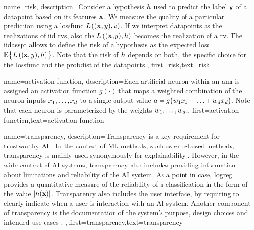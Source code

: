 {name={risk},
	description={Consider a \gls{hypothesis} $h$ used to predict the \gls{label} 
		$y$ of a \gls{datapoint} based on its \gls{feature}s ${\bf x}$. We measure 
		the quality of a particular \gls{prediction} using a \gls{lossfunc} $L\left(({\bf x},y),h \right)$. 
		If we interpret \gls{datapoint}s as the \gls{realization}s of \gls{iid} \gls{rv}s, 
		also the $L\left(({\bf x},y),h \right)$ becomes the \gls{realization} 
		of a \gls{rv}. The \gls{iidasspt} allows to define the risk of a \gls{hypothesis} 
		as the expected \gls{loss} $\mathbb{E} \big\{L\left(({\bf x},y),h \right) \big\}$. 
		Note that the risk of $h$ depends on both, the specific choice for the \gls{lossfunc} and the 
		\gls{probdist} of the \gls{datapoint}s.},
	first={risk},text={risk} 
}

{name={activation function},
	description={Each artificial neuron within an \gls{ann} is 
		assigned an activation function $g(\cdot)$ that maps a weighted combination of 
		the neuron inputs $x_{1},\ldots,x_{d}$ to a single output 
		value $a = g\big(w_{1} x_{1}+\ldots+w_{d} x_{d} \big)$. 
		Note that each neuron is parameterized by the weights $w_{1},\ldots,w_{d}$.},
first={activation function},text={activation function} 
}




{name={transparency},
	description={Transparency is a key requirement for 
		trustworthy AI \cite{HLEGTrustworhtyAI}. In the context of ML methods, 
		such as \gls{erm}-based methods, transparency is mainly used synonymously for \gls{explainability} \cite{gallese2023ai,JunXML2020}. 
		However, in the wide context of AI systems, transparency also includes providing information 
		about limitations and reliability of the AI system. As a point in case, \gls{logreg} provides a 
		quantitative measure of the reliability of a \gls{classification} in the form of the value $|h({\bf x})|$. 
		Transparency also includes the user interface, by requiring to clearly indicate when a user is 
		interaction with an AI system. Another component of transparency is the documentation 
		of the system’s purpose, design choices and intended use cases \cite{Shahriari2017,DatasheetData2021,10.1145/3287560.3287596}. },
	first={transparency},text={transparency} 
}


